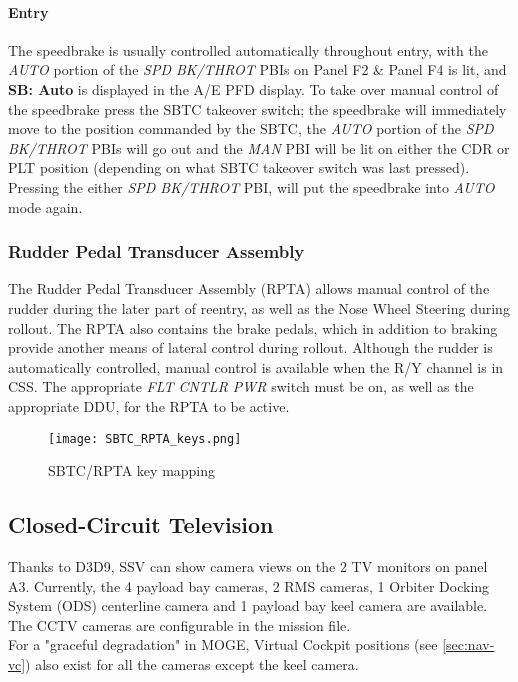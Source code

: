 \documentclass[Space_Shuttle_Vessel_Manual.tex]{subfiles}
\begin{document}
\begin{multicols*}{2}
\paragraph{Entry}
\label{sec:entry}
The speedbrake is usually controlled automatically throughout entry, with the \textit{AUTO} portion of the \textit{SPD BK/THROT} PBIs on Panel F2 \& Panel F4 is lit, and \textbf{SB: Auto} is displayed in the A/E PFD display. To take over manual control of the speedbrake press the SBTC takeover switch; the speedbrake will immediately move to the position commanded by the SBTC, the \textit{AUTO} portion of the \textit{SPD BK/THROT} PBIs will go out and the \textit{MAN} PBI will be lit on either the CDR or PLT position (depending on what SBTC takeover switch was last pressed). Pressing the either \textit{SPD BK/THROT} PBI, will put the speedbrake into \textit{AUTO} mode again.

\subsubsection{Rudder Pedal Transducer Assembly}
The Rudder Pedal Transducer Assembly (RPTA) allows manual control of the rudder during the later part of reentry, as well as the Nose Wheel Steering during rollout. The RPTA also contains the brake pedals, which in addition to braking provide another means of lateral control during rollout. Although the rudder is automatically controlled, manual control is available when the R/Y channel is in CSS. The appropriate \textit{FLT CNTLR PWR} switch must be on, as well as the appropriate DDU, for the RPTA to be active.




\begin{figure}[H]
  \texttt{[image: SBTC\_RPTA\_keys.png]}
  \caption{SBTC/RPTA key mapping}
  \label{fig:SBTC_RPTA_keys}
\end{figure}


\subsection{Closed-Circuit Television}
Thanks to D3D9, SSV can show camera views on the 2 TV monitors on panel A3. Currently, the 4 payload bay cameras, 2 RMS cameras, 1 Orbiter Docking System (ODS) centerline camera and 1 payload bay keel camera are available.\\
The CCTV cameras are configurable in the mission file.\\
For a "graceful degradation" in MOGE, Virtual Cockpit positions (see \ref{sec:nav-vc}) also exist for all the cameras except the keel camera.



\end{multicols*}
\end{document}
